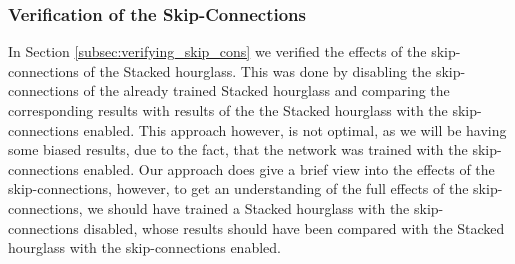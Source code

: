\documentclass[./main.tex]{subfiles}
\begin{document}
\subsubsection{Verification of the Skip-Connections}
In Section \ref{subsec:verifying_skip_cons} we verified the effects of the skip-connections of the Stacked hourglass. This was done by disabling the skip-connections of the already trained Stacked hourglass and comparing the corresponding results with results of the the Stacked hourglass with the skip-connections enabled. This approach however, is not optimal, as we will be having some biased results, due to the fact, that the network was trained with the skip-connections enabled. Our approach does give a brief view into the effects of the skip-connections, however, to get an understanding of the full effects of the skip-connections, we should have trained a Stacked hourglass with the skip-connections disabled, whose results should have been compared with the Stacked hourglass with the skip-connections enabled.
\end{document}
